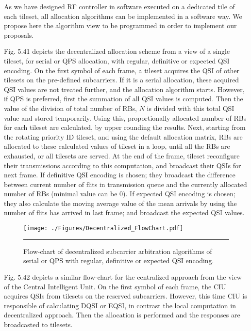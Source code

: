 As we have designed RF controller in software executed on a dedicated tile of each tileset, all allocation algorithms can be implemented in a software way. We propose here the algorithm view to be programmed in order to implement our proposals. 


Fig. 5.41 depicts the decentralized allocation scheme from a view of a single tileset, for serial or QPS allocation, with regular, definitive or expected QSI encoding. On the first symbol of each frame, a tileset acquires the QSI of other tilesets on the pre-defined subcarriers. If it is a serial allocation, these acquired QSI values are not treated further, and the allocation algorithm starts. However, if QPS is preferred, first the summation of all QSI values is computed. Then the value of the division of total number of RBs, $N$ is divided with this total QSI value and stored temporarily. Using this, proportionally allocated number of RBs for each tileset are calculated, by upper rounding the results. Next, starting from the rotating priority ID tileset, and using the default allocation matrix, RBs are allocated to these calculated values of tileset in a loop, until all the RBs are exhausted, or all tilesets are served. At the end of the frame, tileset reconfigure their transmissions according to this computation, and broadcast their QSIs for next frame. If definitive QSI encoding is chosen; they broadcast the difference between current number of flits in transmission queue and the currently allocated number of RBs (minimal value can be 0). If expected QSI encoding is chosen; they also calculate the moving average value of the mean arrivals by using the number of flits has arrived in last frame; and broadcast the expected QSI values. 


\begin{figure}[htbp]
  \centering
    \texttt{[image: ./Figures/Decentralized\_FlowChart.pdf]}
    \rule{35em}{0.5pt}
  \caption[Flow-chart of decentralized subcarrier arbitration algorithms of serial or QPS with regular, definitive or expected QSI encoding.]{Flow-chart of decentralized subcarrier arbitration algorithms of serial or QPS with regular, definitive or expected QSI encoding.} 
  \label{fig:Electron}
\end{figure}

Fig. 5.42 depicts a similar flow-chart for the centralized approach from the view of the Central Intelligent Unit. On the first symbol of each frame, the CIU acquires QSIs from tilesets on the reserved subcarriers. However, this time CIU is responsible of calculating DQSI or EQSI, in contrast the local computation in decentralized approach. Then the allocation is performed and the responses are broadcasted to tilesets. 

